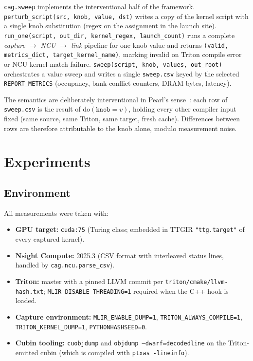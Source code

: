 \documentclass[10pt]{article}
\begin{document}
\texttt{cag.sweep} implements the interventional half of the framework. \texttt{perturb\_script(src, knob, value, dst)} writes a copy of the kernel script with a single knob substitution (regex on the assignment in the launch site). \texttt{run\_one(script, out\_dir, kernel\_regex, launch\_count)} runs a complete \emph{capture $\to$ NCU $\to$ link} pipeline for one knob value and returns \texttt{(valid, metrics\_dict, target\_kernel\_name)}, marking invalid on Triton compile error or NCU kernel-match failure. \texttt{sweep(script, knob, values, out\_root)} orchestrates a value sweep and writes a single \texttt{sweep.csv} keyed by the selected \texttt{REPORT\_METRICS} (occupancy, bank-conflict counters, DRAM bytes, latency).

The semantics are deliberately interventional in Pearl's sense~\citep{pearl2009}: each row of \texttt{sweep.csv} is the result of $\text{do}(\texttt{knob}{=}v)$, holding every other compiler input fixed (same source, same Triton, same target, fresh cache). Differences between rows are therefore attributable to the knob alone, modulo measurement noise.

\section{Experiments}\label{sec:experiments}

\subsection{Environment}\label{sec:env}

All measurements were taken with:
\begin{itemize}[leftmargin=*,itemsep=0.1em,topsep=0.2em]
  \item \textbf{GPU target:} \texttt{cuda:75} (Turing class; embedded in TTGIR \texttt{"ttg.target"} of every captured kernel).
  \item \textbf{Nsight Compute:} 2025.3 (CSV format with interleaved status lines, handled by \texttt{cag.ncu.parse\_csv}).
  \item \textbf{Triton:} master with a pinned LLVM commit per \texttt{triton/cmake/llvm-hash.txt}; \texttt{MLIR\_DISABLE\_THREADING=1} required when the C++ hook is loaded.
  \item \textbf{Capture environment:} \texttt{MLIR\_ENABLE\_DUMP=1}, \texttt{TRITON\_ALWAYS\_COMPILE=1}, \texttt{TRITON\_KERNEL\_DUMP=1}, \texttt{PYTHONHASHSEED=0}.
  \item \textbf{Cubin tooling:} \texttt{cuobjdump} and \texttt{objdump --dwarf=decodedline} on the Triton-emitted cubin (which is compiled with \texttt{ptxas -lineinfo}).
\end{itemize}
\end{document}
